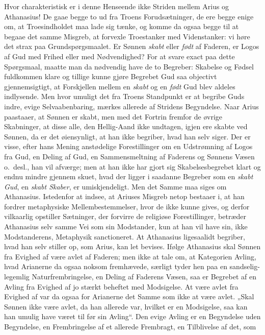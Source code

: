 \documentclass[12pt]{book}
\begin{document}
Hvor charakteristisk er i denne Henseende ikke Striden mellem Arius
og Athanasius! De gaae begge to ud fra Troens Forudsætninger, de ere
begge enige om, at Troesindholdet maa lade sig tænke, og komme da
ogsaa begge til at begaae det samme Misgreb, at forvexle
Troestanker med Videnstanker: vi høre det strax paa
Grundspørgsmaalet. Er Sønnen \emph{skabt} eller \emph{født} af
Faderen, er Logos af Gud med Frihed eller med Nødvendighed? For at
svare exact paa dette Spørgsmaal, maatte man da nødvendig have de to
Begreber: Skabelse og Fødsel fuldkommen klare og tillige kunne gjøre
Begrebet Gud saa objectivt gjennemsigtigt, at Forskjellen mellem en
\emph{skabt} og en \emph{født} Gud blev aldeles indlysende. Men hvor
umuligt det fra Troens Standpunkt er at begribe Guds indre, evige
Selvaabenbaring, mærkes allerede af Stridens Begyndelse. Naar Arius
paastaaer, at Sønnen er skabt, men med det Fortrin fremfor de øvrige
Skabninger, at disse alle, den Hellig-Aand ikke undtagen, igjen ere
skabte ved Sønnen, da er det øiensynligt, at han ikke begriber, hvad
han selv siger. Der er visse, efter hans Mening anstødelige
Forestillinger om en Udstrømning af Logos fra Gud, en Deling af Gud,
en Sammensmeltning af Faderens og Sønnens Væsen o.\ desl., han vil
afværge; men at han ikke har gjort sig Skabelsesbegrebet klart og
endnu mindre gjennem\-
skuet, hvad der ligger i saadanne Begreber som en \emph{skabt Gud},
en \emph{skabt Skaber}, er umiskjendeligt. Men det Samme maa siges
om Athanasius. Istedenfor at indsee, at Ariuses Misgreb netop
bestaaer i, at han fordrer metaphysiske Mellembestemmelser, hvor de
ikke kunne gives, og derfor vilkaarlig opstiller Sætninger, der
forvirre de religiøse Forestillinger, betræder Athanasius selv samme
Vei som sin Modstander, kun at han vil have sin, ikke Modstanderens,
Metaphysik sanctioneret. At Athanasius ligesaalidt begriber, hvad
han selv stiller op, som Arius, kan let bevises. Ifølge Athanasius
skal Sønnen fra Evighed af være avlet af Faderen; men ikke at tale
om, at Kategorien Avling, hvad Arianerne da ogsaa noksom
fremhævede, særligt tyder hen paa en sandselig-legemlig
Naturfrembringelse, en Deling af Faderens Væsen, saa er Begrebet af
en Avling fra Evighed af jo stærkt beheftet med Modsigelse. At være
avlet fra Evighed af var da ogsaa for Arianerne det Samme som ikke
at være avlet. „Skal Sønnen ikke være avlet, da han allerede var,
hvilket er en Modsigelse, saa kan han umulig have været til før sin
Avling“. Den evige Avling er en Begyndelse uden Begyndelse, en
Frembringelse af et allerede Frembragt, en Tilblivelse af det, som
\end{document}
